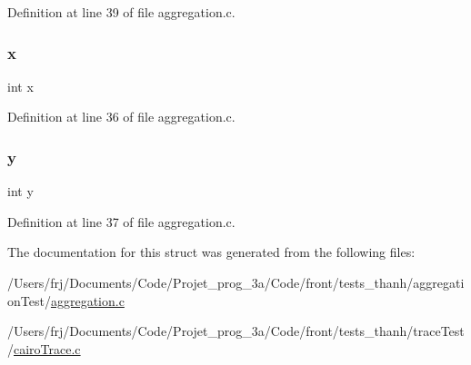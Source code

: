 Definition at line 39 of file aggregation.\+c.

\hypertarget{structpoint_a6150e0515f7202e2fb518f7206ed97dc}{}\label{structpoint_a6150e0515f7202e2fb518f7206ed97dc} 
\subsubsection{\texorpdfstring{x}{x}}
{\footnotesize\ttfamily int x}



Definition at line 36 of file aggregation.\+c.

\hypertarget{structpoint_a0a2f84ed7838f07779ae24c5a9086d33}{}\label{structpoint_a0a2f84ed7838f07779ae24c5a9086d33} 
\subsubsection{\texorpdfstring{y}{y}}
{\footnotesize\ttfamily int y}



Definition at line 37 of file aggregation.\+c.



The documentation for this struct was generated from the following files\+:\begin{DoxyCompactItemize}
\item 
/\+Users/frj/\+Documents/\+Code/\+Projet\+\_\+prog\+\_\+3a/\+Code/front/tests\+\_\+thanh/aggregation\+Test/\hyperlink{aggregation_8c}{aggregation.\+c}\item 
/\+Users/frj/\+Documents/\+Code/\+Projet\+\_\+prog\+\_\+3a/\+Code/front/tests\+\_\+thanh/trace\+Test/\hyperlink{cairo_trace_8c}{cairo\+Trace.\+c}\end{DoxyCompactItemize}
